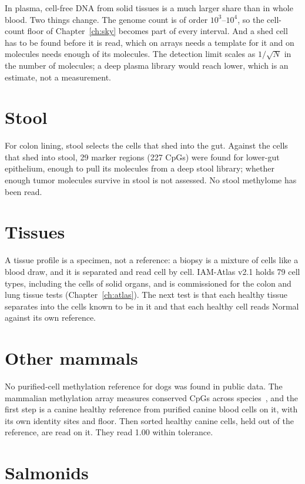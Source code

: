 In plasma, cell-free DNA from solid tissues is a much larger share than in whole blood. Two things change. The genome count is of order $10^3$--$10^4$, so the cell-count floor
of Chapter~\ref{ch:sky} becomes part of every interval. And a shed cell has to be found before it is read, which on arrays needs a template for it and on molecules needs
enough of its molecules. The detection limit scales as $1/\sqrt N$ in the number of molecules; a deep plasma library would reach lower, which is an
estimate, not a measurement. \calc


\section{Stool}

For colon lining, stool selects the cells that shed into the gut. Against the cells that shed into stool, 29 marker regions (227 CpGs) were found for lower-gut
epithelium, enough to pull its molecules from a deep stool library; whether enough tumor molecules survive in stool is not assessed. \measured{} No stool methylome has been read. \openprob

\section{Tissues}

A tissue profile is a specimen, not a reference: a biopsy is a mixture of cells like a blood draw, and it is separated and read cell by cell.
IAM-Atlas v2.1 holds 79 cell types, including the cells of solid organs, and is commissioned for the colon and lung tissue tests (Chapter~\ref{ch:atlas}). The next test is that each healthy tissue separates into the cells known to be in it and that each healthy cell reads Normal against its own reference. \openprob

\section{Other mammals}

No purified-cell methylation reference for dogs was found in public data. \observed{} The mammalian methylation array measures conserved CpGs across species~\cite{Arneson2022}, and the first step is
a canine healthy reference from purified canine blood cells on it, with its own identity sites and floor. Then sorted healthy canine cells, held out of the reference, are
read on it. \prediction{} They read 1.00 within tolerance.

\section{Salmonids}

